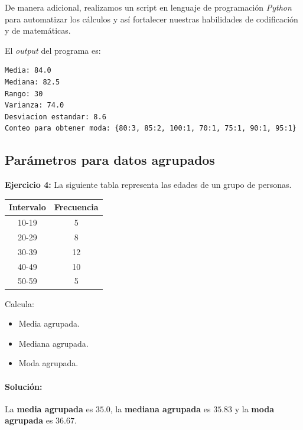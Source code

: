\documentclass[12pt]{article}
\begin{document}
De manera adicional, realizamos un script en lenguaje de programación \textit{Python} para automatizar los cálculos y así fortalecer nuestras habilidades de codificación y de matemáticas.


El \textit{output} del programa es:
\begin{verbatim}
Media: 84.0
Mediana: 82.5
Rango: 30
Varianza: 74.0
Desviacion estandar: 8.6
Conteo para obtener moda: {80:3, 85:2, 100:1, 70:1, 75:1, 90:1, 95:1}
\end{verbatim}

\subsection*{\centering Parámetros para datos agrupados}
\textbf{Ejercicio 4:} La siguiente tabla representa las edades de un grupo de personas.

\begin{table}[h!]
    \begin{center}
        \begin{tabular}{|c|c|}
            \hline
            Intervalo & Frecuencia \\
            \hline
            10-19 & 5 \\
            20-29 & 8 \\
            30-39 & 12 \\
            40-49 & 10 \\
            50-59 & 5 \\
            \hline
        \end{tabular}
    \end{center}
\end{table}

Calcula:
\begin{itemize}
    \item Media agrupada.
    \item Mediana agrupada.
    \item Moda agrupada.
\end{itemize}

\paragraph{\textbf{Solución: }}

La \textbf{media agrupada} es $35.0$, la \textbf{mediana agrupada} es $35.83$ y la \textbf{moda agrupada} es $36.67$. 
\end{document}
